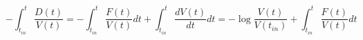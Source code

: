 \begin{equation}
-\int_{t_{in}}^t \frac{D(t)}{V(t)}=-\int_{t_{in}}^t \frac{F(t)}{V(t)} dt + \int_{t_{in}}^t \frac{dV(t)}{dt} dt = -\log \frac{V(t)}{V(t_{in})}+ \int_{t_{in}}^t \frac{F(t)}{V(t)} dt
\end{equation}